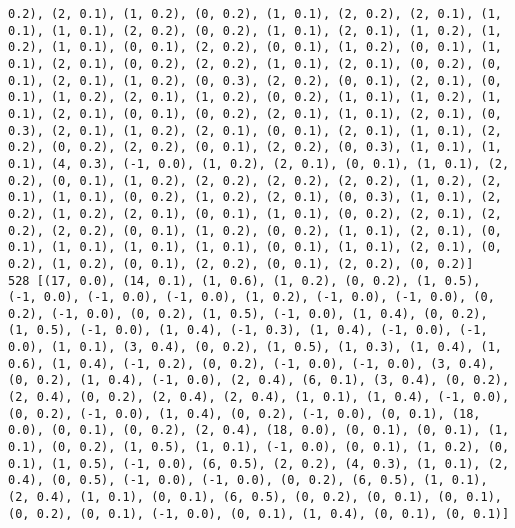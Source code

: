 \documentclass[11pt]{article}
\begin{document}
\begin{Verbatim}[commandchars=\\\{\}]
0.2), (2, 0.1), (1, 0.2), (0, 0.2), (1, 0.1), (2, 0.2), (2, 0.1), (1, 0.1), (1, 0.1), (2, 0.2), (0, 0.2), (1, 0.1), (2, 0.1), (1, 0.2), (1, 0.2), (1, 0.1), (0, 0.1), (2, 0.2), (0, 0.1), (1, 0.2), (0, 0.1), (1, 0.1), (2, 0.1), (0, 0.2), (2, 0.2), (1, 0.1), (2, 0.1), (0, 0.2), (0, 0.1), (2, 0.1), (1, 0.2), (0, 0.3), (2, 0.2), (0, 0.1), (2, 0.1), (0, 0.1), (1, 0.2), (2, 0.1), (1, 0.2), (0, 0.2), (1, 0.1), (1, 0.2), (1, 0.1), (2, 0.1), (0, 0.1), (0, 0.2), (2, 0.1), (1, 0.1), (2, 0.1), (0, 0.3), (2, 0.1), (1, 0.2), (2, 0.1), (0, 0.1), (2, 0.1), (1, 0.1), (2, 0.2), (0, 0.2), (2, 0.2), (0, 0.1), (2, 0.2), (0, 0.3), (1, 0.1), (1, 0.1), (4, 0.3), (-1, 0.0), (1, 0.2), (2, 0.1), (0, 0.1), (1, 0.1), (2, 0.2), (0, 0.1), (1, 0.2), (2, 0.2), (2, 0.2), (2, 0.2), (1, 0.2), (2, 0.1), (1, 0.1), (0, 0.2), (1, 0.2), (2, 0.1), (0, 0.3), (1, 0.1), (2, 0.2), (1, 0.2), (2, 0.1), (0, 0.1), (1, 0.1), (0, 0.2), (2, 0.1), (2, 0.2), (2, 0.2), (0, 0.1), (1, 0.2), (0, 0.2), (1, 0.1), (2, 0.1), (0, 0.1), (1, 0.1), (1, 0.1), (1, 0.1), (0, 0.1), (1, 0.1), (2, 0.1), (0, 0.2), (1, 0.2), (0, 0.1), (2, 0.2), (0, 0.1), (2, 0.2), (0, 0.2)]
528 [(17, 0.0), (14, 0.1), (1, 0.6), (1, 0.2), (0, 0.2), (1, 0.5), (-1, 0.0), (-1, 0.0), (-1, 0.0), (1, 0.2), (-1, 0.0), (-1, 0.0), (0, 0.2), (-1, 0.0), (0, 0.2), (1, 0.5), (-1, 0.0), (1, 0.4), (0, 0.2), (1, 0.5), (-1, 0.0), (1, 0.4), (-1, 0.3), (1, 0.4), (-1, 0.0), (-1, 0.0), (1, 0.1), (3, 0.4), (0, 0.2), (1, 0.5), (1, 0.3), (1, 0.4), (1, 0.6), (1, 0.4), (-1, 0.2), (0, 0.2), (-1, 0.0), (-1, 0.0), (3, 0.4), (0, 0.2), (1, 0.4), (-1, 0.0), (2, 0.4), (6, 0.1), (3, 0.4), (0, 0.2), (2, 0.4), (0, 0.2), (2, 0.4), (2, 0.4), (1, 0.1), (1, 0.4), (-1, 0.0), (0, 0.2), (-1, 0.0), (1, 0.4), (0, 0.2), (-1, 0.0), (0, 0.1), (18, 0.0), (0, 0.1), (0, 0.2), (2, 0.4), (18, 0.0), (0, 0.1), (0, 0.1), (1, 0.1), (0, 0.2), (1, 0.5), (1, 0.1), (-1, 0.0), (0, 0.1), (1, 0.2), (0, 0.1), (1, 0.5), (-1, 0.0), (6, 0.5), (2, 0.2), (4, 0.3), (1, 0.1), (2, 0.4), (0, 0.5), (-1, 0.0), (-1, 0.0), (0, 0.2), (6, 0.5), (1, 0.1), (2, 0.4), (1, 0.1), (0, 0.1), (6, 0.5), (0, 0.2), (0, 0.1), (0, 0.1), (0, 0.2), (0, 0.1), (-1, 0.0), (0, 0.1), (1, 0.4), (0, 0.1), (0, 0.1)]

\end{Verbatim}
\end{document}
